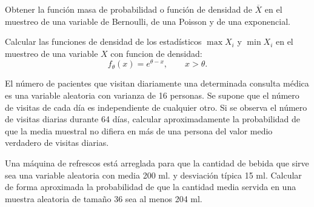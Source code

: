 \begin{ejercicio}
    Obtener la función masa de probabilidad o función de densidad de $\overline{X}$ en el muestreo de una variable de Bernoulli, de una Poisson y de una exponencial.
\end{ejercicio}

\begin{ejercicio}
    Calcular las funciones de densidad de los estadísticos $\max X_i$ y $\min X_i$ en el muestreo de una variable $X$ con funcion de densidad:
    \begin{equation*}
        f_\theta(x) = e^{\theta-x}, \qquad x>\theta.
    \end{equation*}
\end{ejercicio}

\begin{ejercicio}
    El número de pacientes que visitan diariamente una determinada consulta médica es una variable aleatoria con varianza de 16 personas. Se supone que el número de visitas de cada día es independiente de cualquier otro. Si se observa el número de visitas diarias durante 64 días, calcular aproximadamente la probabilidad de que la media muestral no difiera en más de una persona del valor medio verdadero de visitas diarias.
\end{ejercicio}

\begin{ejercicio}
    Una máquina de refrescos está arreglada para que la cantidad de bebida que sirve sea una variable aleatoria con media 200 ml. y desviación típica 15 ml. Calcular de forma aproximada la probabilidad de que la cantidad media servida en una muestra aleatoria de tamaño 36 sea al menos 204 ml.
\end{ejercicio}
